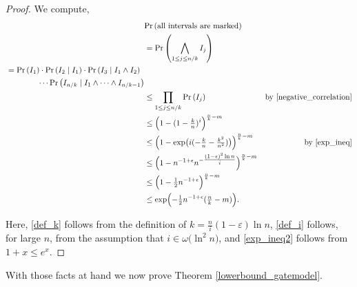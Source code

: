 \documentclass{article}
\newcommand{\Pro}[1]{\mbox{{\rm Pr}}\left(#1\right)}
\begin{document}
\begin{proof}
We compute,
\begin{alignat}{2}
&\Pro{\text{all intervals are marked}} \\
 & = \Pro{\bigwedge_{1\leq j \leq n/k} I_j}\notag\\
				      \begin{split}&= \Pro{I_1} \cdot \Pro{I_2 \mid I_1} \cdot \Pro{I_3 \mid I_1 \wedge I_2 } \notag\\
							& \quad \quad \quad  \quad \cdots \Pro{I_{n/k} \mid I_1 \wedge \cdots \wedge I_{n/k-1}}\end{split}\notag\\
				      &\leq \prod_{1 \leq j\leq n/k} \Pro{I_j} & \text{by \eqref{negative_correlation}} \notag\\
					&\leq \Bigl(1-(1-\tfrac{k}{n})^{i}\Bigr)^{\frac{n}{k}-m}\notag\\
					&\leq \Bigl(1-\exp\bigl(i(-\tfrac{k}{n}-\tfrac{k^2}{n^2})\bigr)\Bigr)^{\frac{n}{k}-m} & \text{by \eqref{exp_ineq}}\notag\\
					&\leq \Bigl(1-n^{-1+\epsilon} n^{-\tfrac{(1-\epsilon)^2\ln n}{i}}\Bigr)^{\frac{n}{k}-m}  \label{def_k}\\
					&\leq \Bigl(1-\tfrac{1}{2}n^{-1+\epsilon}\Bigr)^{\frac{n}{k}-m} \label{def_i}\\
					&\leq \exp\Bigl(-\tfrac{1}{2}n^{-1+\epsilon}(\tfrac{n}{k}-m)\Bigr) \label{exp_ineq2}.						
\end{alignat} 


Here, \eqref{def_k} follows from the definition of $k = \frac{n}{i}(1-\varepsilon) \ln n$, \eqref{def_i} follows, for large $n$, from the assumption that $i \in \omega\bigl(\ln^2 n\bigr)$, and \eqref{exp_ineq2} follows from $1+x \leq e^x$. 
\end{proof}
With those facts at hand we now prove Theorem \ref{lowerbound_gatemodel}.
\end{document}
